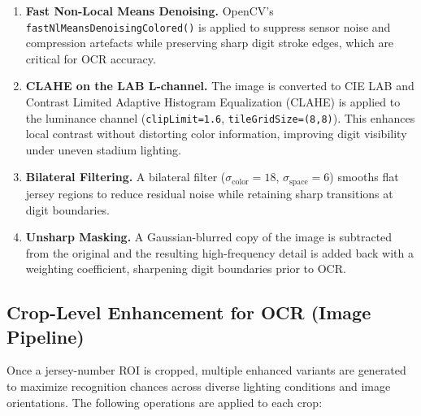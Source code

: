 \begin{enumerate}

    \item \textbf{Fast Non-Local Means Denoising.}
    OpenCV's \texttt{fastNlMeansDenoisingColored()} is applied to
    suppress sensor noise and compression artefacts while preserving
    sharp digit stroke edges, which are critical for OCR accuracy.

    \item \textbf{CLAHE on the LAB L-channel.}
    The image is converted to CIE LAB and Contrast Limited Adaptive
    Histogram Equalization (CLAHE) is applied to the luminance channel
    (\texttt{clipLimit=1.6}, \texttt{tileGridSize=(8,8)}). This
    enhances local contrast without distorting color information,
    improving digit visibility under uneven stadium lighting.

    \item \textbf{Bilateral Filtering.}
    A bilateral filter ($\sigma_{\text{color}}=18$,
    $\sigma_{\text{space}}=6$) smooths flat jersey regions to reduce
    residual noise while retaining sharp transitions at digit
    boundaries.

    \item \textbf{Unsharp Masking.}
    A Gaussian-blurred copy of the image is subtracted from the
    original and the resulting high-frequency detail is added back
    with a weighting coefficient, sharpening digit boundaries prior
    to OCR.
\end{enumerate}

\subsection{Crop-Level Enhancement for OCR (Image Pipeline)}

Once a jersey-number ROI is cropped, multiple enhanced variants are
generated to maximize recognition chances across diverse lighting
conditions and image orientations. The following operations are
applied to each crop:

